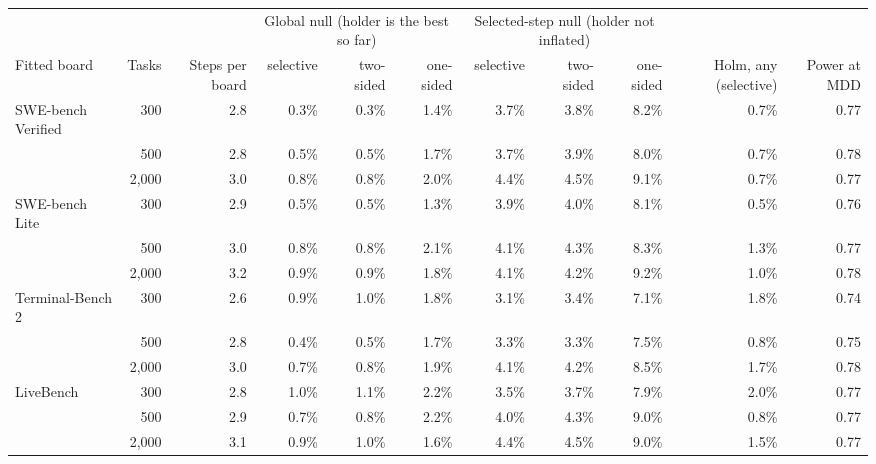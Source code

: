 \begin{tabular}{lrrrrrrrrrr}
\toprule
 & & & \multicolumn{3}{c}{Global null (holder is the best so far)} & \multicolumn{3}{c}{Selected-step null (holder not inflated)} & & \\
Fitted board & Tasks & Steps per board & selective & two-sided & one-sided & selective & two-sided & one-sided & Holm, any (selective) & Power at MDD \\
\midrule
SWE-bench Verified & 300 & 2.8 & 0.3\% & 0.3\% & 1.4\% & 3.7\% & 3.8\% & 8.2\% & 0.7\% & 0.77 \\
 & 500 & 2.8 & 0.5\% & 0.5\% & 1.7\% & 3.7\% & 3.9\% & 8.0\% & 0.7\% & 0.78 \\
 & 2,000 & 3.0 & 0.8\% & 0.8\% & 2.0\% & 4.4\% & 4.5\% & 9.1\% & 0.7\% & 0.77 \\
\addlinespace
SWE-bench Lite & 300 & 2.9 & 0.5\% & 0.5\% & 1.3\% & 3.9\% & 4.0\% & 8.1\% & 0.5\% & 0.76 \\
 & 500 & 3.0 & 0.8\% & 0.8\% & 2.1\% & 4.1\% & 4.3\% & 8.3\% & 1.3\% & 0.77 \\
 & 2,000 & 3.2 & 0.9\% & 0.9\% & 1.8\% & 4.1\% & 4.2\% & 9.2\% & 1.0\% & 0.78 \\
\addlinespace
Terminal-Bench 2 & 300 & 2.6 & 0.9\% & 1.0\% & 1.8\% & 3.1\% & 3.4\% & 7.1\% & 1.8\% & 0.74 \\
 & 500 & 2.8 & 0.4\% & 0.5\% & 1.7\% & 3.3\% & 3.3\% & 7.5\% & 0.8\% & 0.75 \\
 & 2,000 & 3.0 & 0.7\% & 0.8\% & 1.9\% & 4.1\% & 4.2\% & 8.5\% & 1.7\% & 0.78 \\
\addlinespace
LiveBench & 300 & 2.8 & 1.0\% & 1.1\% & 2.2\% & 3.5\% & 3.7\% & 7.9\% & 2.0\% & 0.77 \\
 & 500 & 2.9 & 0.7\% & 0.8\% & 2.2\% & 4.0\% & 4.3\% & 9.0\% & 0.8\% & 0.77 \\
 & 2,000 & 3.1 & 0.9\% & 1.0\% & 1.6\% & 4.4\% & 4.5\% & 9.0\% & 1.5\% & 0.77 \\
\bottomrule
\end{tabular}
